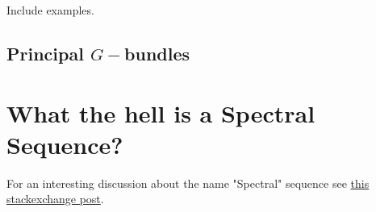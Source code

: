 \documentclass[11pt]{article}
\begin{document}
\begin{bluebox}
  Include examples.
\end{bluebox}

\vskip 1cm
\subsection{Principal $G-$bundles}


\newpage
\section{What the hell is a Spectral Sequence?}




\begin{remark}
  For an interesting discussion about the name "Spectral" sequence see \href{https://mathoverflow.net/questions/17357/what-is-so-spectral-about-spectral-sequences#:~:text=They%20were%20introduced%20by%20Leray,terrifying%2C%20evil%2C%20and%20dangerous.}{this stackexchange post}.
\end{remark}





\newpage
\vskip 0.5cm
\end{document}
